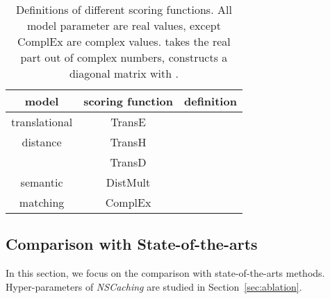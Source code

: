 \documentclass[conference]{IEEEtran}
\begin{document}
\begin{table}[ht]
	\centering
\caption{Definitions of different scoring functions.
		All model parameter are real values,
		except ComplEx are complex values.
		 takes the real part out of complex numbers,
		 constructs a diagonal matrix with .}
\label{tb-score-func}
	\renewcommand{\arraystretch}{1.3}
	\begin{tabular}{c|c|c}
		\hline
		model     &           scoring function            &                                                                   definition                                                                   \\ \hline
		translational & TransE \cite{bordes2013translating} &                                                                                               \\ \cline{2-3}
		distance    &   TransH \cite{wang2014knowledge}   &               \\ \cline{2-3}
		&    TransD \cite{ji2015knowledge}    &  \\ \hline
		semantic    &  DistMult \cite{yang2014embedding}  &                                                                                                       \\ \cline{2-3}
		matching    & ComplEx \cite{trouillon2016complex} &                                                                                            \\ \hline
	\end{tabular}
\end{table}



\subsection{Comparison with State-of-the-arts}
\label{ssec:compstate}


In this section,
we focus on the comparison with state-of-the-arts methods.
Hyper-parameters of \textit{NSCaching} are studied in Section~\ref{sec:ablation}.
\end{document}
